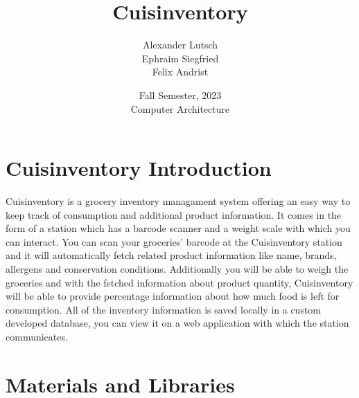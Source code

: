 \documentclass{article}
\author{Alexander Lutsch\\Ephraim Siegfried\\Felix Andrist}
\title{ \Huge Cuisinventory }
\date{Fall Semester, 2023 \\ Computer Architecture}
\begin{document}
\maketitle

\section{Cuisinventory Introduction}
Cuisinventory is a grocery inventory managament system offering an easy way to keep track of consumption and additional product information.
It comes in the form of a station which has a barcode scanner and a weight scale with which you can interact. You can scan your groceries' barcode at the Cuisinventory station and
it will automatically fetch related product information like name, brands, allergens and conservation conditions. Additionally you will be able to weigh the groceries and with the fetched information about product quantity,
Cuisinventory will be able to provide percentage information about how much food is left for consumption. All of the inventory information is saved locally in a custom developed database, you can view it on a web application with which the station communicates.

\section{Materials and Libraries}
\end{document}
